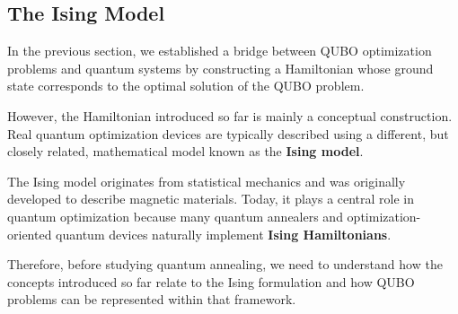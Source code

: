 \subsection{The Ising Model}\label{sec:ising-model}

In the previous section, we established a bridge between QUBO optimization problems and quantum systems by constructing a Hamiltonian whose ground state corresponds to the optimal solution of the QUBO problem.

\highspace
However, the Hamiltonian introduced so far is mainly a conceptual construction. Real quantum optimization devices are typically described using a different, but closely related, mathematical model known as the \textbf{Ising model}.

\highspace
The Ising model originates from statistical mechanics and was originally developed to describe magnetic materials. Today, it plays a central role in quantum optimization because many quantum annealers and optimization-oriented quantum devices naturally implement \textbf{Ising Hamiltonians}.

\highspace
Therefore, before studying quantum annealing, we need to understand how the concepts introduced so far relate to the Ising formulation and how QUBO problems can be represented within that framework.